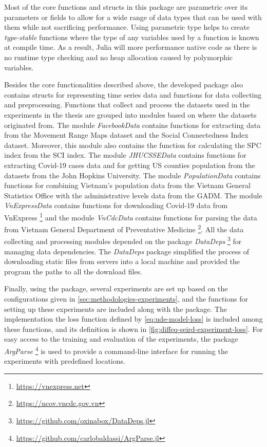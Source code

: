Most of the core functions and structs in this package are parametric over its parameters or fields to allow for a wide range of data types that can be used with them while not sacrificing performance.
Using parametric type helps to create \textit{type-stable} functions where the type of any variables used by a function is known at compile time.
As a result, Julia will more performance native code as there is no runtime type checking and no heap allocation caused by polymorphic variables.

Besides the core functionalities described above, the developed package also contains structs for representing time series data and functions for data collecting and preprocessing.
Functions that collect and process the datasets used in the experiments in the thesis are grouped into modules based on where the datasets originated from.
The module \textit{FacebookData} contains functions for extracting data from the Movement Range Maps dataset and the Social Connectedness Index dataset.
Moreover, this module also contains the function for calculating the \gls{SPC} index from the \gls{SCI} index.
The module \textit{JHUCSSEData} contains functions for extracting Covid-19 cases data and for getting \gls{US} counties population from the datasets from the John Hopkins University.
The module \textit{PopulationData} contains functions for combining Vietnam's population data from the Vietnam General Statistics Office with the administrative levels data from the \gls{GADM}.
The module \textit{VnExpressData} contains functions for downloading Covid-19 data from VnExpress \footnote{\url{https://vnexpress.net}} and the module \textit{VnCdcData} contains functions for parsing the data from Vietnam General Department of Preventative Medicine \footnote{\url{https://ncov.vncdc.gov.vn}}.
All the data collecting and processing modules depended on the package \textit{DataDeps} \footnote{\url{https://github.com/oxinabox/DataDeps.jl}} for managing data dependencies.
The \textit{DataDeps} package simplified the process of downloading static files from servers into a local machine and provided the program the paths to all the download files.

Finally, using the package, several experiments are set up based on the configurations given in \autoref{sec:methodologies-experiments}, and the functions for setting up these experiments are included along with the package.
The implementation the loss function defined by \autoref{eq:ude-model-loss} is included among these functions, and its definition is shown in \autoref{fig:diffeq-seird-experiment-loss}.
For easy access to the training and evaluation of the experiments, the package \textit{ArgParse} \footnote{\url{https://github.com/carlobaldassi/ArgParse.jl}} is used to provide a command-line interface for running the experiments with predefined locations.
